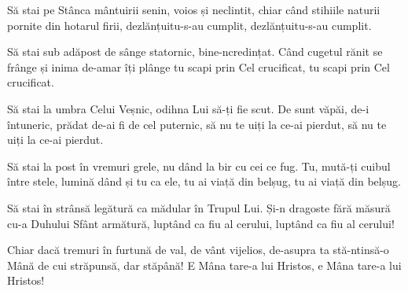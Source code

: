 \beginverse
Să stai pe Stânca mântuirii
senin, voios și neclintit,
chiar când stihiile naturii
pornite din hotarul firii,
dezlănțuitu-s-au cumplit,
dezlănțuitu-s-au cumplit.
\endverse

\beginverse
Să stai sub adăpost de sânge
statornic, bine-ncredințat.
Când cugetul rănit se frânge
și inima de-amar îți plânge
tu scapi prin Cel crucificat,
tu scapi prin Cel crucificat.
\endverse

\beginverse
Să stai la umbra Celui Veșnic,
odihna Lui să-ți fie scut.
De sunt văpăi, de-i întuneric,
prădat de-ai fi de cel puternic,
să nu te uiți la ce-ai pierdut,
să nu te uiți la ce-ai pierdut.
\endverse

\beginverse
Să stai la post în vremuri grele,
nu dând la bir cu cei ce fug.
Tu, mută-ți cuibul între stele,
lumină dând și tu ca ele,
tu ai viață din belșug,
tu ai viață din belșug.
\endverse

\beginverse
Să stai în strânsă legătură
ca mădular în Trupul Lui.
Și-n dragoste fără măsură
cu-a Duhului Sfânt armătură,
luptând ca fiu al cerului,
luptând ca fiu al cerului!
\endverse

\beginverse
Chiar dacă tremuri în furtună
de val, de vânt vijelios,
de-asupra ta stă-ntinsă-o Mână
de cui străpunsă, dar stăpână!
E Mâna tare-a lui Hristos,
e Mâna tare-a lui Hristos!
\endverse
\endsong